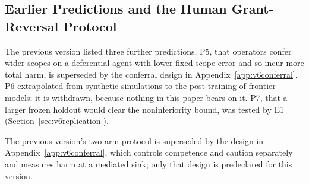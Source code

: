 \subsection{Earlier Predictions and the Human Grant-Reversal Protocol}

The previous version listed three further predictions. P5, that operators confer wider scopes on a deferential agent
with lower fixed-scope error and so incur more total harm, is superseded by the conferral design in
Appendix~\ref{app:v6conferral}. P6 extrapolated from synthetic simulations to the post-training of frontier models; it
is withdrawn, because nothing in this paper bears on it. P7, that a larger frozen holdout would clear the
noninferiority bound, was tested by E1 (Section~\ref{sec:v6replication}).

 The previous version's two-arm protocol is superseded by the design in
Appendix~\ref{app:v6conferral}, which controls competence and caution separately and measures harm at a mediated sink;
only that design is predeclared for this version.
